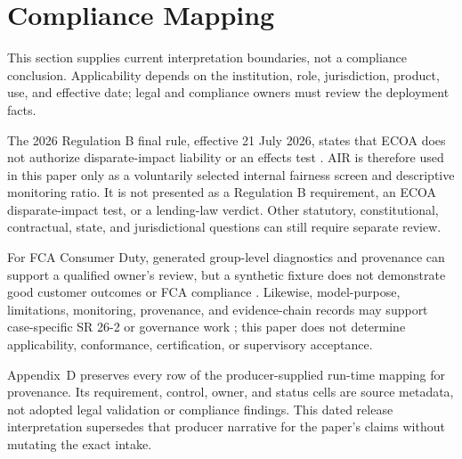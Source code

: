 
\section{Compliance Mapping}
This section supplies current interpretation boundaries, not a compliance conclusion. Applicability depends on the institution, role, jurisdiction, product, use, and effective date; legal and compliance owners must review the deployment facts.

The 2026 Regulation B final rule, effective 21 July 2026, states that ECOA does not authorize disparate-impact liability or an effects test \citep{cfpb_regb_2026}. AIR is therefore used in this paper only as a voluntarily selected internal fairness screen and descriptive monitoring ratio. It is not presented as a Regulation B requirement, an ECOA disparate-impact test, or a lending-law verdict. Other statutory, constitutional, contractual, state, and jurisdictional questions can still require separate review.

For FCA Consumer Duty, generated group-level diagnostics and provenance can support a qualified owner's review, but a synthetic fixture does not demonstrate good customer outcomes or FCA compliance \citep{fca_consumer_duty_2026}. Likewise, model-purpose, limitations, monitoring, provenance, and evidence-chain records may support case-specific SR 26-2 or \EUAIAct{} governance work \citep{sr26_2,eu_ai_act}; this paper does not determine applicability, conformance, certification, or supervisory acceptance.

Appendix~D preserves every row of the producer-supplied run-time mapping for provenance. Its requirement, control, owner, and status cells are source metadata, not adopted legal validation or compliance findings. This dated release interpretation supersedes that producer narrative for the paper's claims without mutating the exact intake.

